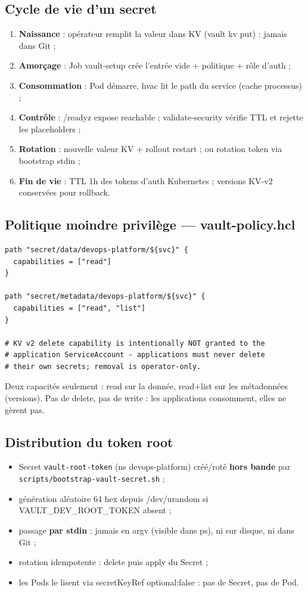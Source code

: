 \documentclass[12pt,a4paper,twoside,openright]{report}
\begin{document}
\subsection{Cycle de vie d'un secret}
\begin{enumerate}[itemsep=1pt]
  \item \textbf{Naissance} : opérateur remplit la valeur dans KV (vault kv put) : jamais dans Git ;
  \item \textbf{Amorçage} : Job vault-setup crée l'entrée vide + politique + rôle d'auth ;
  \item \textbf{Consommation} : Pod démarre, hvac lit le path du service (cache processus) ;
  \item \textbf{Contrôle} : /readyz expose reachable ; validate-security vérifie TTL et rejette les placeholders ;
  \item \textbf{Rotation} : nouvelle valeur KV + rollout restart ; ou rotation token via bootstrap stdin ;
  \item \textbf{Fin de vie} : TTL 1h des tokens d'auth Kubernetes ; versions KV-v2 conservées pour rollback.
\end{enumerate}

\subsection{Politique moindre privilège --- vault-policy.hcl}
\begin{lstlisting}[caption={k8s/vault/vault-policy.hcl : intégralité utile}]
path "secret/data/devops-platform/${svc}" {
  capabilities = ["read"]
}

path "secret/metadata/devops-platform/${svc}" {
  capabilities = ["read", "list"]
}

# KV v2 delete capability is intentionally NOT granted to the
# application ServiceAccount - applications must never delete
# their own secrets; removal is operator-only.
\end{lstlisting}

Deux capacités seulement : read sur la donnée, read+list sur les métadonnées (versions). Pas de delete, pas de write : les applications consomment, elles ne gèrent pas.

\subsection{Distribution du token root}
\begin{itemize}[itemsep=1pt]
  \item Secret \texttt{vault-root-token} (ns devops-platform) créé/roté \textbf{hors bande} par \texttt{scripts/bootstrap-vault-secret.sh} ;
  \item génération aléatoire 64 hex depuis /dev/urandom si VAULT\_DEV\_ROOT\_TOKEN absent ;
  \item passage \textbf{par stdin} : jamais en argv (visible dans ps), ni sur disque, ni dans Git ;
  \item rotation idempotente : delete puis apply du Secret ;
  \item les Pods le lisent via secretKeyRef optional:false : pas de Secret, pas de Pod.
\end{itemize}
\end{document}
